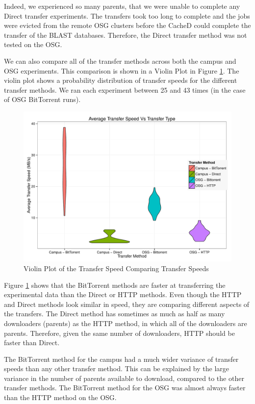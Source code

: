 Indeed, we experienced so many parents, that we were unable to complete any Direct transfer experiments.  The transfers took too long to complete and the jobs were evicted from the remote OSG clusters before the CacheD could complete the transfer of the BLAST databases.  Therefore, the Direct transfer method was not tested on the OSG.

We can also compare all of the transfer methods across both the campus and OSG experiments.  This comparison is shown in a Violin Plot \cite{hintze1998violin} in Figure \ref{fig:violinplots}.  The violin plot shows a probability distribution of transfer speeds for the different transfer methods.  We ran each experiment between 25 and 43 times (in the case of OSG BitTorrent runs).

\begin{figure}[h!t]
\includegraphics[width=\textwidth]{images/ViolinPlot.pdf}
\caption{Violin Plot of the Transfer Speed Comparing Transfer Speeds}
\label{fig:violinplots}
\end{figure}

Figure \ref{fig:violinplots} shows that the BitTorrent methods are faster at transferring the experimental data than the Direct or HTTP methods.  Even though the HTTP and Direct methods look similar in speed, they are comparing different aspects of the transfers.  The Direct method has sometimes as much as half as many downloaders (parents) as the HTTP method, in which all of the downloaders are parents.  Therefore, given the same number of downloaders, HTTP should be faster than Direct.

The BitTorrent method for the campus had a much wider variance of transfer speeds than any other transfer method.  This can be explained by the large variance in the number of parents available to download, compared to the other transfer methods.  The BitTorrent method for the OSG was almost always faster than the HTTP method on the OSG.

